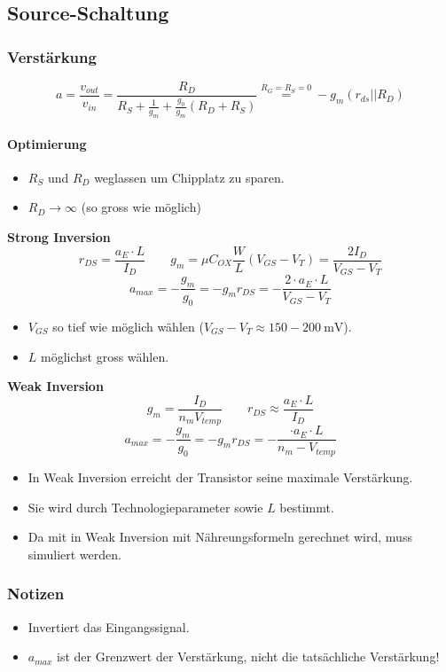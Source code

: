 \subsection{Source-Schaltung}

\subsubsection{Verstärkung}
\[
    a = \frac{v_{out}}{v_{in}} = \frac{R_D}{R_S + \frac{1}{g_m} + \frac{g_0}{g_m}(R_D + R_S)} \overset{R_G = R_S = 0}{=} - g_m (r_{ds} || R_D)
\]

\paragraph{Optimierung}
\begin{itemize}
    \item $R_S$ und $R_D$ weglassen um Chipplatz zu sparen.
    \item $R_D \to \infty$ (so gross wie möglich)
\end{itemize}

\textbf{Strong Inversion}
\[
    r_{DS} = \frac{a_E \cdot L}{I_D} \qquad g_m = \mu C_{OX} \frac{W}{L} (V_{GS} - V_T) = \frac{2 I_D}{V_{GS}-V_T}
\]
\[
    a_{max} = - \frac{g_m}{g_0} = -g_m r_{DS} = -\frac{2\cdot a_E \cdot L}{V_{GS} - V_T}
\]
\begin{itemize}
    \item $V_{GS}$ so tief wie möglich wählen ($V_{GS}-V_T \approx 150 - \qty{200}{\milli\volt}$).
    \item $L$ möglichst gross wählen.
\end{itemize}

\textbf{Weak Inversion}
\[
    g_{m} = \frac{I_D}{n_m V_{temp}} \qquad r_{DS} \approx \frac{a_E \cdot L}{I_D}
\]
\[
    a_{max} = - \frac{g_m}{g_0} = -g_m r_{DS} = -\frac{\cdot a_E \cdot L}{n_m - V_{temp}}
\]
\begin{itemize}
    \item In Weak Inversion erreicht der Transistor seine maximale Verstärkung.
    \item Sie wird durch Technologieparameter sowie $L$ bestimmt.
    \item Da mit in Weak Inversion mit Nähreungsformeln gerechnet wird, muss simuliert werden.
\end{itemize}

\subsubsection{Notizen}
\begin{itemize}
    \item Invertiert das Eingangssignal.
    \item $a_{max}$ ist der Grenzwert der Verstärkung, nicht die tatsächliche Verstärkung!
\end{itemize}

